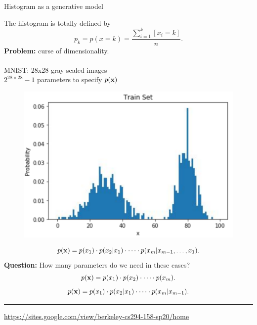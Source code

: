 \begin{frame}{Histogram as a generative model}

\begin{minipage}[t]{0.6\columnwidth}
    The histogram is totally defined by
	\[
	    p_k = p(x = k) = \frac{\sum_{i=1}^k [x_i = k]}{n}.
	\]
	\textbf{Problem:} curse of dimensionality. \\
	\vspace{0.05cm} \\
	MNIST: 28x28 gray-scaled images \\
	$2^{28\times28} - 1$ parameters to specify $p(\mathbf{x})$ 
	\end{minipage}%
	\begin{minipage}[t]{0.4\columnwidth}
    \begin{figure}[h]
        \centering
        \includegraphics[width=\linewidth]{figs/histogram.png}
    \end{figure}
\end{minipage}
\[
    p(\mathbf{x}) = p(x_1) \cdot p(x_2 | x_1) \cdot \dots \cdot p(x_m | x_{m-1}, \dots, x_1).
\]
\textbf{Question:} How many parameters do we need in these cases?
\[
    p(\mathbf{x}) = p(x_1) \cdot p(x_2)\cdot \dots \cdot p(x_m).
\]
\[
    p(\mathbf{x}) = p(x_1) \cdot p(x_2 | x_1) \cdot \dots \cdot p(x_m | x_{m-1}).
\]
\vspace{0.05cm}
\hrule\medskip
{\scriptsize  \href{https://sites.google.com/view/berkeley-cs294-158-sp20/home}{https://sites.google.com/view/berkeley-cs294-158-sp20/home}}
\end{frame}
